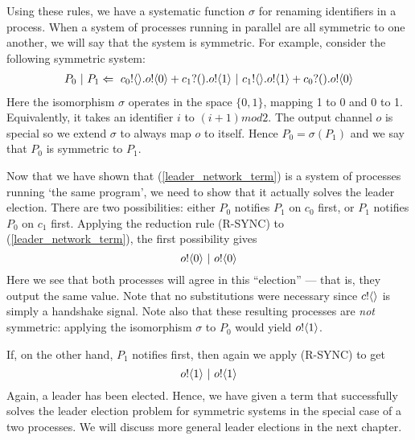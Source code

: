 Using these rules, we have a systematic function $\sigma$ for renaming identifiers in a process.  When a system of processes running in parallel are all symmetric to one another, we will say that the system is symmetric.
For example, consider the following symmetric system:
\begin{align}
	P_0\ |\  P_1 \Leftarrow\  {c_0}!\langle{}\rangle. {o}!\langle{0}\rangle + {c_1}?({}). {o}!\langle{1}\rangle \ |\  {c_1}!\langle{}\rangle. {o}!\langle{1}\rangle + {c_0}?({}). {o}!\langle{0}\rangle
	\label{leader_network_term}	
\end{align}
Here the isomorphism $\sigma$ operates in the space $\{0,1\}$, mapping 1 to 0 and 0 to 1.  
Equivalently, it takes an identifier $i$ to $(i+1)mod 2$.
The output channel $o$ is special so we extend $\sigma$ to always map $o$ to itself.
Hence $P_0 = \sigma(P_1)$ and we say that $P_0$ is symmetric to $P_1$.

Now that we have shown that (\ref{leader_network_term}) is a system of processes running `the same program', we need to show that it actually solves the leader election. 
There are two possibilities: either $P_0$ notifies $P_1$ on $c_0$ first, or $P_1$ notifies $P_0$ on $c_1$ first.  
Applying the reduction rule (R-SYNC) to (\ref{leader_network_term}), the first possibility gives
\[
	 {o}!\langle{0}\rangle \ |\  {o}!\langle{0}\rangle	
\]
Here we see that both processes will agree in this ``election'' --- that is, they output the same value.  Note that no substitutions were necessary since ${c}!\langle{}\rangle$ is simply a handshake signal.  Note also that these resulting processes are \emph{not} symmetric: applying the isomorphism $\sigma$ to $P_0$ would yield ${o}!\langle{1}\rangle$.

If, on the other hand, $P_1$ notifies first, then again we apply (R-SYNC) to get
\[
	{o}!\langle{1}\rangle \ |\  {o}!\langle{1}\rangle
\]
Again, a leader has been elected.
Hence, we have given a term that successfully solves the leader election problem for symmetric systems in the special case of a two processes.  We will discuss more general leader elections in the next chapter.